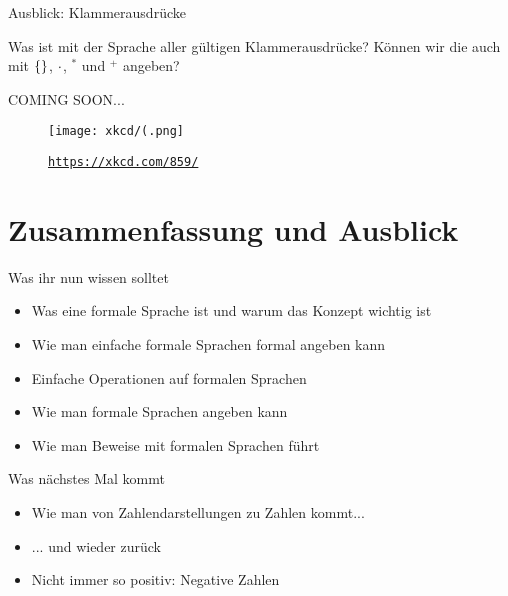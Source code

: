 \begin{frame}{Ausblick: Klammerausdrücke}

	Was ist mit der Sprache aller gültigen Klammerausdrücke? Können wir die auch mit $\left\{\right\}$, $\cdot$, ${}^*$ und ${}^+$ angeben? \\[1em]
	\pause

	\begin{block}{}
		\Large
		\centering
		COMING SOON... \\[1em]
	\end{block}

	\begin{figure}[H]
		\centering
		\texttt{[image: xkcd/(.png]}
		\vspace{-7pt}
		\caption{ \texttt{\url{https://xkcd.com/859/}} }
	\end{figure}
\end{frame}

%

\appendix
\beginbackup

\section{Zusammenfassung und Ausblick}

\begin{frame}
	\begin{block}{Was ihr nun wissen solltet}
		\begin{itemize}
			\item Was eine formale Sprache ist und warum das Konzept wichtig ist
			\item Wie man einfache formale Sprachen formal angeben kann
			\item Einfache Operationen auf formalen Sprachen
			\item Wie man formale Sprachen angeben kann
			\item Wie man Beweise mit formalen Sprachen führt
		\end{itemize}
	\end{block}

	\begin{block}{Was nächstes Mal kommt}
		\begin{itemize}
			\item Wie man von Zahlendarstellungen zu Zahlen kommt...
			\item[] ... und wieder zurück
			\item Nicht immer so positiv: Negative Zahlen
		\end{itemize}
	\end{block}
\end{frame}







\backupend


